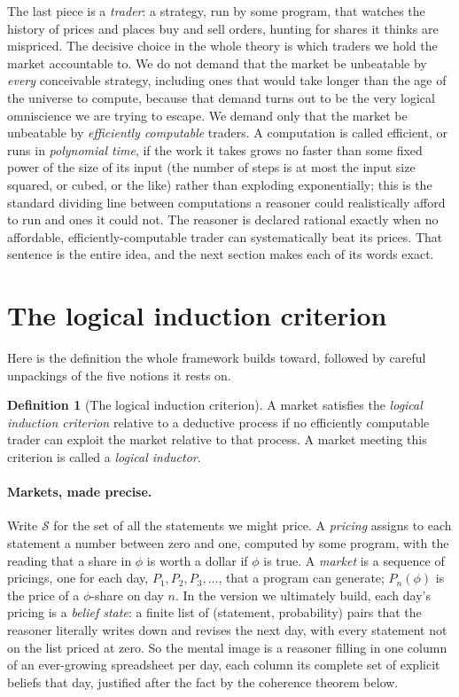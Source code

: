 \documentclass[10pt]{article}
\theoremstyle{definition}
\newtheorem{definition}[theorem]{Definition}
\theoremstyle{remark}
\begin{document}
The last piece is a \emph{trader}: a strategy, run by some program, that watches the history of prices and places buy and sell orders, hunting for shares it thinks are mispriced. The decisive choice in the whole theory is which traders we hold the market accountable to. We do not demand that the market be unbeatable by \emph{every} conceivable strategy, including ones that would take longer than the age of the universe to compute, because that demand turns out to be the very logical omniscience we are trying to escape. We demand only that the market be unbeatable by \emph{efficiently computable} traders. A computation is called efficient, or runs in \emph{polynomial time}, if the work it takes grows no faster than some fixed power of the size of its input (the number of steps is at most the input size squared, or cubed, or the like) rather than exploding exponentially; this is the standard dividing line between computations a reasoner could realistically afford to run and ones it could not. The reasoner is declared rational exactly when no affordable, efficiently-computable trader can systematically beat its prices. That sentence is the entire idea, and the next section makes each of its words exact.

\section{The logical induction criterion}
\label{sec:criterion}

Here is the definition the whole framework builds toward, followed by careful unpackings of the five notions it rests on.

\begin{definition}[The logical induction criterion]
\label{def:lic}
A market satisfies the \emph{logical induction criterion} relative to a deductive process if no efficiently computable trader can exploit the market relative to that process. A market meeting this criterion is called a \emph{logical inductor}.
\end{definition}

\paragraph{Markets, made precise.} Write $\mathcal{S}$ for the set of all the statements we might price. A \emph{pricing} assigns to each statement a number between zero and one, computed by some program, with the reading that a share in $\phi$ is worth a dollar if $\phi$ is true. A \emph{market} is a sequence of pricings, one for each day, $P_1, P_2, P_3, \dots$, that a program can generate; $P_n(\phi)$ is the price of a $\phi$-share on day $n$. In the version we ultimately build, each day's pricing is a \emph{belief state}: a finite list of (statement, probability) pairs that the reasoner literally writes down and revises the next day, with every statement not on the list priced at zero. So the mental image is a reasoner filling in one column of an ever-growing spreadsheet per day, each column its complete set of explicit beliefs that day, justified after the fact by the coherence theorem below.
\end{document}
